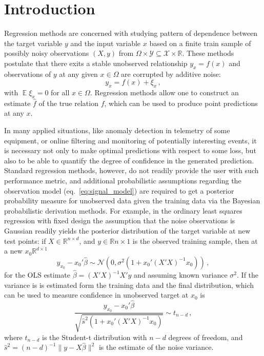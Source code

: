 \documentclass[a4paper,14pt]{extarticle}
\newcommand{\ex}{\mathop{\mathbb{E}}\nolimits}
\newcommand{\Ncal}{\mathcal{N}}
\newcommand{\Xcal}{\mathcal{X}}
\newcommand{\Ycal}{\mathcal{Y}}
\newcommand{\Real}{\mathbb{R}}
\begin{document}
\section{Introduction} %
\label{sec:introduction}

Regression methods are concerned with studying pattern of dependence between the
target variable $y$ and the input variable $x$ based on a finite train sample of 
possibly noisy observations $(X, y)$ from $\Omega\times \Ycal \subseteq \Xcal\times\Real$.
These methods postulate that there exits a stable unobserved relationship $y_x = f(x)$
and observations of $y$ at any given $x\in\Omega$ are corrupted by additive noise:
\begin{equation} \label{eq:signal_model}
  y_x = f(x) + \xi_x \,,
\end{equation}
with $\ex \xi_x = 0$ for all $x\in \Omega$. Regression methods allow one to construct
an estimate $\hat{f}$ of the true relation $f$, which can be used to produce point
predictions at any $x$.

In many applied situations, like anomaly detection in telemetry of some equipment,
or online filtering and monitoring of potentially interesting events, it is necessary
not only to make optimal predictions with respect to some loss, but also to be able
to quantify the degree of confidence in the generated prediction. Standard regression
methods, however, do not readily provide the user with such performance metric, and
additional probabilistic assumptions regarding the observation model (eq.~\ref{eq:signal_model})
are required to get a posterior probability measure for unobserved data given the
training data via the Bayesian probabilistic derivation methods.
For example, in the ordinary least squares regression with fixed design the assumption
that the noise observations is Gaussian readily yields the posterior distribution of
the target variable at new test points: if $X\in \Real^{n\times d}$, and $y\in\Real{n\times1}$
is the observed training sample, then at a new $x_0\Real^{d\times 1}$
\begin{equation}
  y_{x_0} - x_0'\hat{\beta} \sim \Ncal(0, \sigma^2(1 + x_0'(X'X)^{-1} x_0)) \,,
\end{equation}
for the OLS estimate $\hat{\beta} = (X'X)^{-1} X'y$ and assuming known variance $\sigma^2$.
If the variance is is estimated form the training data and the final distribution,
which can be used to measure confidence in unobserved target at $x_0$ is
\begin{equation*}
  \frac{y_{x_0} - x_0'\hat{\beta}}{\sqrt{\hat{s}^2 (1 + x_0'(X'X)^{-1} x_0)}}
    \sim t_{n-d} \,,
\end{equation*}
where $t_{n-d}$ is the Student-t distribution with $n-d$ degrees of freedom, and
$\hat{s}^2 = (n-d)^{-1}\|y-X\hat{\beta}\|^2$ is the estimate of the noise variance.
\end{document}
